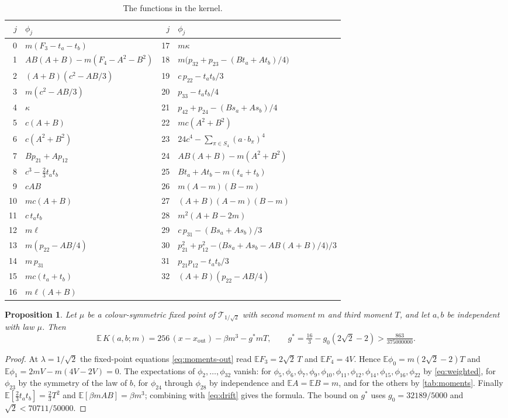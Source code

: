 \documentclass[11pt]{amsart}
\newtheorem{proposition}[theorem]{Proposition}
\theoremstyle{definition}
\theoremstyle{remark}
\newcommand{\E}{\mathbb{E}}
\begin{document}
\begin{table}[h]
\centering\small
\begin{tabular}{rl@{\qquad}rl}
\toprule
$j$ & $\phi_j$ & $j$ & $\phi_j$\\
\midrule
0 & $m(F_3-t_a-t_b)$ & 17 & $m\kappa$\\
1 & $AB(A+B)-m(F_4-A^2-B^2)$ & 18 & $m\big(p_{32}+p_{23}-(Bt_a+At_b)/4\big)$\\
2 & $(A+B)(c^2-AB/3)$ & 19 & $c\,p_{22}-t_at_b/3$\\
3 & $m(c^2-AB/3)$ & 20 & $p_{33}-t_at_b/4$\\
4 & $\kappa$ & 21 & $p_{42}+p_{24}-(Bs_a+As_b)/4$\\
5 & $c(A+B)$ & 22 & $mc(A^2+B^2)$\\
6 & $c(A^2+B^2)$ & 23 & $24c^4-\sum_{\pi\in S_4}(a\cdot b_\pi)^4$\\
7 & $Bp_{21}+Ap_{12}$ & 24 & $AB(A+B)-m(A^2+B^2)$\\
8 & $c^3-\tfrac23t_at_b$ & 25 & $Bt_a+At_b-m(t_a+t_b)$\\
9 & $cAB$ & 26 & $m(A-m)(B-m)$\\
10 & $mc(A+B)$ & 27 & $(A+B)(A-m)(B-m)$\\
11 & $c\,t_at_b$ & 28 & $m^2(A+B-2m)$\\
12 & $m\ell$ & 29 & $c\,p_{31}-(Bs_a+As_b)/3$\\
13 & $m(p_{22}-AB/4)$ & 30 & $p_{21}^2+p_{12}^2-\big(Bs_a+As_b-AB(A+B)/4\big)/3$\\
14 & $m\,p_{31}$ & 31 & $p_{21}p_{12}-t_at_b/3$\\
15 & $mc(t_a+t_b)$ & 32 & $(A+B)(p_{22}-AB/4)$\\
16 & $m\ell(A+B)$ & & \\
\bottomrule
\end{tabular}
\caption{The functions in the kernel.}\label{tab:features}
\end{table}

\begin{proposition}\label{prop:expect}
Let $\mu$ be a colour-symmetric fixed point of $\mathcal T_{1/\sqrt2}$ with second moment $m$ and third
moment $T$, and let $a,b$ be independent with law $\mu$. Then
\[
\E\,K(a,b;m)=256\,(x-x_{\mathrm{out}})-\beta m^3-g^*mT,\qquad
g^*=\tfrac{16}3-g_0(2\sqrt2-2)>\tfrac{863}{375000000}.
\]
\end{proposition}

\begin{proof}
At $\lambda=1/\sqrt2$ the fixed-point equations \eqref{eq:moments-out} read $\E F_3=2\sqrt2\,T$ and
$\E F_4=4V$. Hence $\E\phi_0=m(2\sqrt2-2)T$ and $\E\phi_1=2mV-m(4V-2V)=0$. The expectations of
$\phi_2,\dots,\phi_{32}$ vanish: for $\phi_5,\phi_6,\phi_7,\phi_9,\phi_{10},\phi_{11},\phi_{12},\phi_{14},
\phi_{15},\phi_{16},\phi_{22}$ by \eqref{eq:weighted}, for $\phi_{23}$ by the symmetry of the law of $b$,
for $\phi_{24}$ through $\phi_{28}$ by independence and $\E A=\E B=m$, and for the others by
\cref{tab:moments}. Finally $\E[\tfrac23t_at_b]=\tfrac23T^2$ and $\E[\beta mAB]=\beta m^3$; combining
with \eqref{eq:drift} gives the formula. The bound on $g^*$ uses $g_0=32189/5000$ and
$\sqrt2<70711/50000$.
\end{proof}
\end{document}
